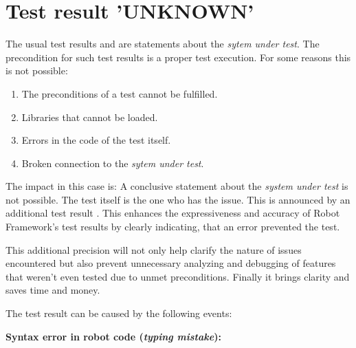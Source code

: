 %
%
%

\chapter{Test result 'UNKNOWN'}

The usual test results  and  are statements about the \emph{sytem under test}. The precondition for such test results
is a proper test execution. For some reasons this is not possible:
\begin{enumerate}
   \item The preconditions of a test cannot be fulfilled.
   \item Libraries that cannot be loaded.
   \item Errors in the code of the test itself.
   \item Broken connection to the \emph{sytem under test}.
\end{enumerate}

The impact in this case is: A conclusive statement about the \emph{system under test} is not possible.
The test itself is the one who has the issue. This is announced by an additional test result .
This enhances the expressiveness and accuracy of Robot Framework’s test results by clearly indicating, that an error
prevented the test.

This additional precision will not only help clarify the nature of issues encountered but also prevent unnecessary
analyzing and debugging of features that weren't even tested due to unmet preconditions.
Finally it brings clarity and saves time and money.

\vspace{2ex}

The test result  can be caused by the following events:

\vspace{2ex}

\textbf{Syntax error in robot code (\textit{typing mistake}):}

